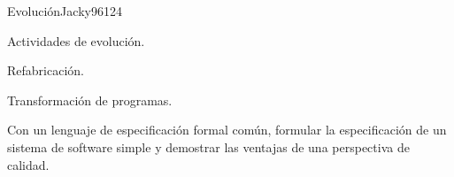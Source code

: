 \begin{syllabus}
\begin{unit}{Evolución}{Jacky96}{12}{4}
   \begin{topics}
      \item Actividades de evolución.
      \begin{inparaenum}
         \item Refabricación.
         \item Transformación de programas.
      \end{inparaenum}
   \end{topics}
   \begin{learningoutcomes}
      \item Con un lenguaje de especificación formal común, formular la especificación de un sistema de software simple y demostrar las ventajas de una perspectiva de calidad.
   \end{learningoutcomes}
\end{unit}



\begin{coursebibliography}
\end{coursebibliography}

\end{syllabus}
